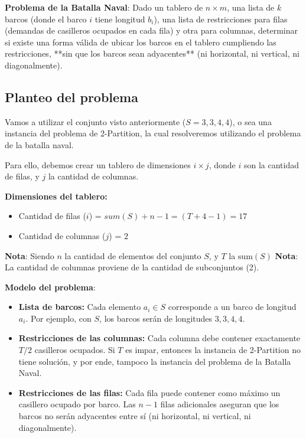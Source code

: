 \textbf{Problema de la Batalla Naval}: Dado un tablero de $n \times m$, una lista de $k$ barcos (donde el barco $i$ tiene longitud $b_i$), una lista de restricciones para filas (demandas de casilleros ocupados en cada fila) y otra para columnas, determinar si existe una forma válida de ubicar los barcos en el tablero cumpliendo las restricciones, **sin que los barcos sean adyacentes** (ni horizontal, ni vertical, ni diagonalmente).

\subsection*{Planteo del problema}

Vamos a utilizar el conjunto visto anteriormente ($S = {3,3,4,4}$), o sea una instancia del problema de 2-Partition, la cual resolveremos utilizando el problema de la batalla naval.

Para ello, debemos crear un tablero de dimensiones $i \times j$, donde $i$ son la cantidad de filas, y $j$ la cantidad de columnas.

\textbf{Dimensiones del tablero:}
\begin{itemize}
    \item Cantidad de filas ($i$) = $sum(S) + n - 1  = (T + 4 - 1 ) = 17$
    \item Cantidad de columnas ($j$) = $2$ 
\end{itemize}

\textbf{Nota}: Siendo $n$ la cantidad de elementos del conjunto $S$, y $T$ la $\text{sum}(S)$
\textbf{Nota}: La cantidad de columnas proviene de la cantidad de subconjuntos (2).

\textbf{Modelo del problema}:

\begin{itemize}
    \item \textbf{Lista de barcos:} Cada elemento $a_i \in S$ corresponde a un barco de longitud $a_i$. Por ejemplo, con $S$, los barcos serán de longitudes $3, 3, 4, 4$.

    \item \textbf{Restricciones de las columnas:}
    Cada columna debe contener exactamente $T / 2$ casilleros ocupados. Si $T$ es impar, entonces la instancia de 2-Partition no tiene solución, y por ende, tampoco la instancia del problema de la Batalla Naval.

    \item \textbf{Restricciones de las filas:}
    Cada fila puede contener como máximo un casillero ocupado por barco. Las $n - 1$ filas adicionales aseguran que los barcos no serán adyacentes entre sí (ni horizontal, ni vertical, ni diagonalmente).
\end{itemize}

